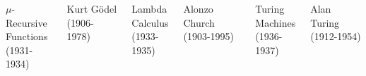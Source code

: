 \begin{frame}{}
  \begin{columns}
      \vspace{-0.80cm} 
      \begin{center}
	{$\mu$-Recursive Functions \\ (1931-1934)}
      \end{center}

      \vspace{-0.60cm} 
      \vspace{-0.80cm} 
      \begin{center}
	{\small Kurt G\"{o}del (1906-1978)}
      \end{center}
      \pause
      \vspace{-0.80cm} 
      \begin{center}
	{Lambda Calculus \\ (1933-1935)}
      \end{center}

      \vspace{-0.60cm} 
      \vspace{-0.80cm} 
      \begin{center}
	{\small Alonzo Church (1903-1995)}
      \end{center}
      \pause
      \vspace{-0.80cm} 
      \begin{center}
	{Turing Machines \\ (1936-1937)}
      \end{center}

      \vspace{-0.60cm} 
      \vspace{-0.80cm} 
      \begin{center}
	{\small Alan Turing (1912-1954)}
      \end{center}
  \end{columns}
\end{frame}
